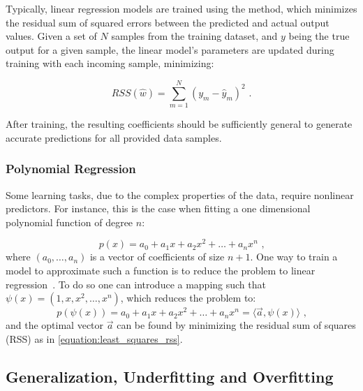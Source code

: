 Typically, linear regression models are trained using the  method, which minimizes the residual sum of squared errors between the predicted and actual output values.
Given a set of \(N\) samples from the training dataset, and \(y\) being the true output for a given sample, the linear model's parameters are updated during training with each incoming sample, minimizing:

\begin{equation}
    RSS(\hat{w}) = \sum_{m=1}^{N} (y_m - \hat{y}_m)^2 \text{ .}
    \label{equation:least_squares_rss}
\end{equation}

After training, the resulting coefficients should be sufficiently general to generate accurate predictions for all provided data samples.

\subsubsection*{Polynomial Regression}

Some learning tasks, due to the complex properties of the data, require nonlinear predictors.
For instance, this is the case when fitting a one dimensional polynomial function of degree \(n\):

\begin{equation}
    p(x) = a_0 + a_1 x + a_2 x^2 + \dots + a_n x^n \text{ ,}
    \label{equation:polynomial_function}
\end{equation}
where \((a_0, \ldots, a_n)\) is a vector of coefficients of size \(n+1\).
One way to train a model to approximate such a function is to reduce the problem to linear regression~\cite{BOOK:ShalevShwartz:Understanding_Machine_Learning}.
To do so one can introduce a mapping such that \(\psi(x)=\left(1, x, x^2, \ldots, x^n\right)\), which reduces the problem to:
\begin{equation}
    p(\psi(x)) = a_0 + a_1 x + a_2 x^2 + \ldots + a_n x^n = \langle \vec{a}, \psi(x) \rangle \text{ ,}
    \label{equation:polynomial_function_linear_mapping}
\end{equation}
and the optimal vector \(\vec{a}\) can be found by minimizing the residual sum of squares (RSS) as in \cref{equation:least_squares_rss}.

\subsection{Generalization, Underfitting and Overfitting}

